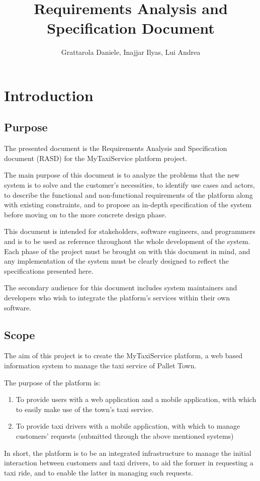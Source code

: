 \documentclass[english]{article}
\begin{document}
\title{Requirements Analysis and Specification Document\pagebreak{}}

\author{
	Grattarola Daniele, Inajjar Ilyas, Lui Andrea
}

\maketitle
\tableofcontents{}

\pagebreak{}


\section{Introduction}


\subsection{Purpose}

The presented document is the Requirements Analysis and Specification
document (RASD) for the MyTaxiService platform project. 

The main purpose of this document is to analyze the problems that
the new system is to solve and the customer's necessities, to identify
use cases and actors, to describe the functional and non-functional
requirements of the platform along with existing constraints, and
to propose an in-depth specification of the system before moving on
to the more concrete design phase. 

This document is intended for stakeholders, software engineers, and
programmers and is to be used as reference throughout the whole development
of the system. Each phase of the project must be brought on with this
document in mind, and any implementation of the system must be clearly
designed to reflect the specifications presented here.

The secondary audience for this document includes system maintainers
and developers who wish to integrate the platform's services within
their own software.


\subsection{Scope}

The aim of this project is to create the MyTaxiService platform, a
web based information system to manage the taxi service of Pallet
Town. 

The purpose of the platform is:
\begin{enumerate}
\item To provide users with a web application and a mobile application,
with which to easily make use of the town's taxi service.
\item To provide taxi drivers with a mobile application, with which to manage
customers' requests (submitted through the above mentioned systems)
\end{enumerate}
In short, the platform is to be an integrated infrastructure to manage
the initial interaction between customers and taxi drivers, to aid
the former in requesting a taxi ride, and to enable the latter in
managing such requests. 
\end{document}
